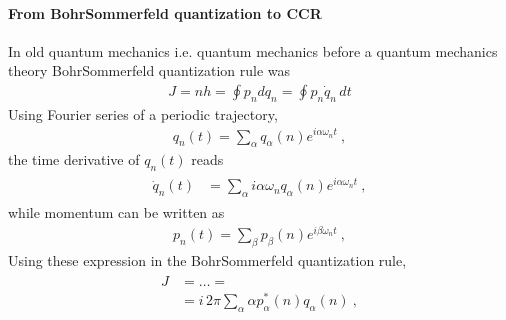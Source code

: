 \documentclass[letterpaper,10pt,english]{jupyterBook}
\begin{document}
\paragraph{From Bohr\sphinxhyphen{}Sommerfeld quantization to CCR}
\label{\detokenize{ch/quantum-mechanics/history/heisenberg-reinterpretation:from-bohr-sommerfeld-quantization-to-ccr}}\label{\detokenize{ch/quantum-mechanics/history/heisenberg-reinterpretation:quantum-mechanics-history-heisenberg-reinterpretation-ccr-quantization-rule-sommerfeld-to-ccr}}
\sphinxAtStartPar
In old quantum mechanics \sphinxhyphen{} i.e. quantum mechanics before a quantum mechanics theory \sphinxhyphen{} Bohr\sphinxhyphen{}Sommerfeld quantization rule was
\begin{equation*}
\begin{split}J = n h = \oint p_n d q_n = \oint p_n \dot{q}_n \, dt \end{split}
\end{equation*}
\sphinxAtStartPar
{} Using Fourier series of a periodic trajectory,
\begin{equation*}
\begin{split}q_n(t) = \sum_{\alpha} q_\alpha(n) e^{i \alpha \omega_n t} \ ,\end{split}
\end{equation*}
\sphinxAtStartPar
the time derivative of \(q_n(t)\) reads
\begin{equation*}
\begin{split}\begin{aligned}
  \dot{q}_n(t) & = \sum_{\alpha} i \alpha \omega_n q_{\alpha}(n) e^{i \alpha \omega_n t} \ ,
\end{aligned}\end{split}
\end{equation*}
\sphinxAtStartPar
while momentum can be written as
\begin{equation*}
\begin{split}p_n(t) = \sum_{\beta} p_\beta(n) e^{i \beta \omega_n t} \ ,\end{split}
\end{equation*}
\sphinxAtStartPar
Using these expression in the Bohr\sphinxhyphen{}Sommerfeld quantization rule,
\begin{equation*}
\begin{split}\begin{aligned}
  J
  & = \dots = \\
  & = i \, 2 \pi \sum_{\alpha} \alpha p^*_{\alpha}(n) q_{\alpha}(n) \ ,
\end{aligned}\end{split}
\end{equation*}
\end{document}
